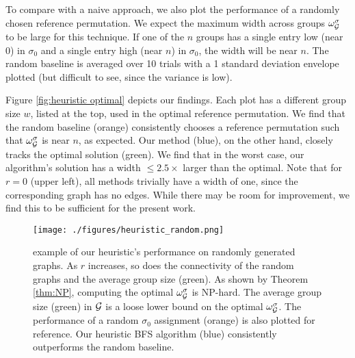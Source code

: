 To compare with a naive approach, we also plot the performance of a randomly chosen reference permutation. We expect the maximum width across groups $\omega_{\mathcal{G}}^\sigma$ to be large for this technique. If one of the $n$ groups has a single entry low (near 0) in $\sigma_0$ and a single entry high (near $n$) in $\sigma_0$, the width will be near $n$. The random baseline is averaged over 10 trials with a 1 standard deviation envelope plotted (but difficult to see, since the variance is low). 

Figure \ref{fig:heuristic optimal} depicts our findings. Each plot has a different group size $w$, listed at the top, used in the optimal reference permutation. We find that the random baseline (orange) consistently chooses a reference permutation such that $\omega_{\mathcal{G}}^\sigma$ is near $n$, as expected. Our method (blue), on the other hand, closely tracks the optimal solution (green). We find that in the worst case, our algorithm's solution has a width $\leq 2.5 \times$ larger than the optimal. Note that for $r = 0$ (upper left), all methods trivially have a width of one, since the corresponding graph has no edges. While there may be room for improvement, we find this to be sufficient for the present work. 



\begin{figure}[h]
    \centering
    \texttt{[image: ./figures/heuristic\_random.png]}
    \caption[example of our heuristic's performance on randomly generated graphs.]{example of our heuristic's performance on randomly generated graphs. As $r$ increases, so does the connectivity of the random graphs and the average group size (green). As shown by Theorem \ref{thm:NP}, computing the optimal $\omega_{\mathcal{G}}^\sigma$ is NP-hard. The average group size (green) in $\mathcal{G}$ is a loose lower bound on the optimal $\omega_{\mathcal{G}}^\sigma$. The performance of a random $\sigma_0$ assignment (orange) is also plotted for reference. Our heuristic BFS algorithm (blue) consistently outperforms the random baseline.}
    \label{fig:heuristic random}
\end{figure}

